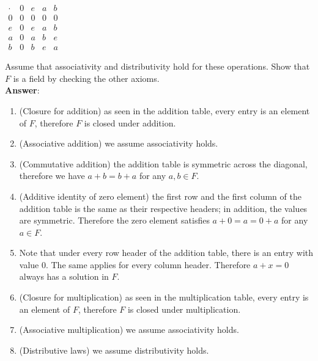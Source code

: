 \documentclass{article}
\begin{document}
\begin{enumerate}
\begin{center}
\begin{multicols}{2}
                        $\begin{array}{c|cccc}
                                    \cdot & 0 & e & a & b \\
                                    \hline
                                    0     & 0 & 0 & 0 & 0 \\
                                    e     & 0 & e & a & b \\
                                    a     & 0 & a & b & e \\
                                    b     & 0 & b & e & a
                              \end{array}$
                  \end{multicols}
            \end{center}
            Assume that associativity and distributivity hold for these operations. Show that $F$ is a field by checking the other axioms.\\
            \textbf{Answer}:
            \begin{enumerate}
                  \item (Closure for addition) as seen in the addition table, every entry is an element of $F$, therefore $F$ is closed under addition.
                  \item (Associative addition) we assume associativity holds.
                  \item (Commutative addition) the addition table is symmetric across the diagonal, therefore we have $a+b=b+a$ for any $a,b\in F$.
                  \item (Additive identity of zero element) the first row and the first column of the addition table is the same as their respective headers; in addition, the values are symmetric. Therefore the zero element satisfies $a+0=a=0+a$ for any $a\in F$.
                  \item Note that under every row header of the addition table, there is an entry with value 0. The same applies for every column header. Therefore $a+x=0$ always has a solution in $F$.
                  \item (Closure for multiplication) as seen in the multiplication table, every entry is an element of $F$, therefore $F$ is closed under multiplication.
                  \item (Associative multiplication) we assume associativity holds.
                  \item (Distributive laws) we assume distributivity holds.
            \end{enumerate}

\end{enumerate}
\end{document}
